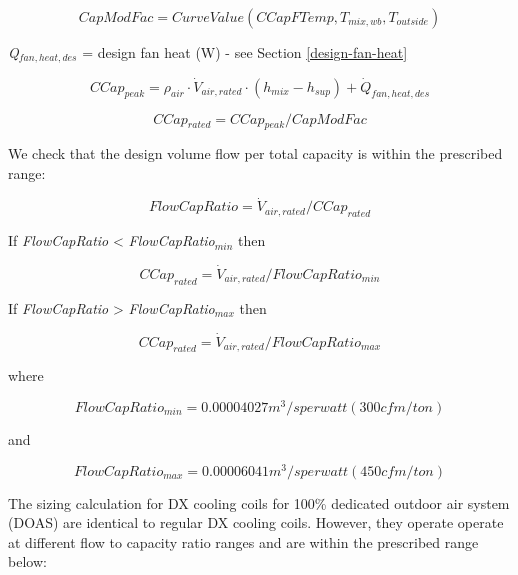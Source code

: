 \begin{equation}
\textit{CapModFac} = \textit{CurveValue}(CCapFTemp,\textit{T\(_{mix,wb}\)},\textit{T\(_{outside}\)})
\end{equation}

\emph{Q\(_{fan,heat,des}\)} = design fan heat (W) - see Section \ref{design-fan-heat}

\begin{equation}
CCap_{peak} = \rho_{air} \cdot \dot V_{air,rated} \cdot (h_{mix} - h_{sup}) + \dot{Q}_{fan,heat,des}
\end{equation}

\begin{equation}
\textit{CCap\(_{rated}\)} = \textit{CCap\(_{peak}\)}/ \textit{CapModFac}
\end{equation}

We check that the design volume flow per total capacity is within the prescribed range:

\begin{equation}
FlowCapRatio = \dot V_{air,rated}/CCap_{rated}
\end{equation}

If \emph{FlowCapRatio} \textless{} \emph{FlowCapRatio\(_{min}\)} then

\begin{equation}
CCap_{rated} = \dot V_{air,rated}/FlowCapRatio_{min}
\end{equation}

If \emph{FlowCapRatio} \textgreater{} \emph{FlowCapRatio\(_{max}\)} then

\begin{equation}
CCap_{rated} = \dot V_{air,rated}/FlowCapRatio_{max}
\end{equation}

where

\begin{equation}
FlowCapRatio_{min} = 0.00004027 m^{3}/s per watt (300 cfm/ton)
\end{equation}

and

\begin{equation}
FlowCapRatio_{max} = 0.00006041 m^{3}/s per watt (450 cfm/ton)
\end{equation}

The sizing calculation for DX cooling coils for 100\% dedicated outdoor air system (DOAS) are identical to regular DX cooling coils. However, they operate operate at different flow to capacity ratio ranges and are within the prescribed range below:

